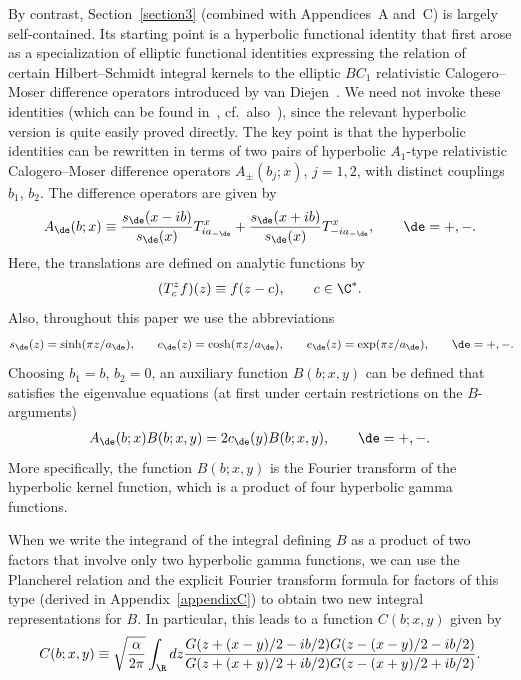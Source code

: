 By contrast, Section~\ref{section3} (combined with Appendices~A and~C) is largely self-contained. Its starting point is a hyperbolic functional identity that f\/irst arose as a specialization of elliptic functional identities expressing the relation of certain Hilbert--Schmidt integral kernels to the elliptic $BC_1$ relativistic Calogero--Moser dif\/ference operators introduced by van Diejen~\cite{diej}. We need not invoke these identities (which can be found in~\cite{HSI}, cf.~also~\cite{noum}), since the relevant hyperbolic version is quite easily proved directly. The key point is that the hyperbolic identities can be rewritten in terms of two pairs of hyperbolic $A_1$-type relativistic Calogero--Moser dif\/fe\-rence operators $A_{\pm}(b_j;x)$, $j=1,2$, with distinct couplings $b_1$, $b_2$. The dif\/ference operators are given by
\begin{gather}\label{Apm}
A_{\de}(b;x)\equiv \frac{s_{\de}(x-ib)}{s_{\de}(x)}T^x_{ia_{-\de}}+\frac{s_{\de}(x+ib)}{s_{\de}(x)}T^x_{-ia_{-\de}},\qquad \de=+,-.
\end{gather}
Here, the translations are def\/ined on analytic functions by
\begin{gather}\label{Tdef}
(T^z_cf)(z)\equiv f(z-c),\qquad c\in\C^{*}.
\end{gather}
Also, throughout this paper we use the abbreviations
\begin{gather}\label{denot}
s_{\de}(z)=\sinh(\pi z/a_{\de}),\! \qquad c_{\de}(z)=\cosh(\pi z/a_{\de}),\! \qquad e_{\de}(z)=\exp(\pi z/a_{\de}),\! \qquad \de=+,-.\!\!
\end{gather}
Choosing $b_1=b$, $b_2=0$, an auxiliary function $B(b;x,y)$ can be def\/ined that satisf\/ies the eigenvalue equations (at f\/irst under certain restrictions on the $B$-arguments)
\begin{gather}\label{AdeB}
A_{\de}(b;x)B(b;x,y)=2c_{\de}(y)B(b;x,y),\qquad \de=+,-.
\end{gather}
 More specif\/ically, the function $B(b;x,y)$ is the Fourier transform of the hyperbolic kernel function, which is a product of four hyperbolic gamma functions.

When we write the integrand of the integral def\/ining $B$ as a product of two factors that involve only two hyperbolic gamma functions, we can use the Plancherel relation and the explicit Fourier transform formula for factors of this type (derived in Appendix~\ref{appendixC}) to obtain two new integral representations for $B$.  In particular, this leads to a function $C(b;x,y)$ given by
\begin{gather}\label{defC}
C(b;x,y)\equiv \sqrt{\frac{\alpha}{2\pi}}\int_{\R}dz \frac{G(z+ (x-y)/2-ib/2)G(z- (x-y)/2-ib/2)}{G(z+ (x+y)/2+ib/2)G(z- (x+y)/2+ib/2)}.
\end{gather}

